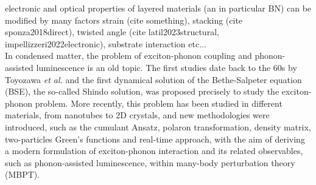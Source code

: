%
electronic and optical properties of layered materials (an in particular BN) can be modified by many factors
strain (cite something), stacking (cite sponza2018direct), twisted angle (cite latil2023structural, impellizzeri2022electronic), substrate interaction etc...\\

%
%

In condensed matter, the problem of exciton-phonon coupling and phonon-assisted luminescence is an old topic. The first studies date back to the $60$s by Toyozawa \emph{et al.}\cite{toyozawa2003optical,toyozawa1964interband} and the first dynamical solution of the Bethe-Salpeter equation (BSE), the so-called Shindo solution, was proposed precisely to study the exciton-phonon problem.\cite{shindo1970effective}
More recently, this problem has been studied in different materials, from nanotubes\cite{perebeinos} to 2D crystals, and new methodologies were introduced, such as the cumulant Ansatz\cite{cudazzo2020first}, polaron transformation,\cite{feldtmann2009phonon} density matrix,\cite{brem2020phonon} two-particles Green's functions\cite{antonius2017theory} and real-time approach,\cite{paleari2022coupling} with the aim of deriving a modern formulation of exciton-phonon interaction and its related observables, such as phonon-assisted luminescence, within many-body perturbation theory (MBPT).